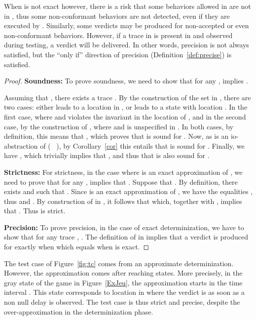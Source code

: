 \documentclass{LMCS}
\theoremstyle{plain}\newtheorem{proposition}[thm]{Proposition}
\begin{document}
When  is not exact however, there is a risk that some
behaviors allowed in  are not in , thus some
non-conformant behaviors are not detected, even if they are executed
by .
Similarly, some  verdicts may be produced for non-accepted 
or even non-conformant behaviors.
However, if a trace in  is present in  and observed during testing, 
a  verdict will be delivered. In other words, precision 
is not  always satisfied, but the ``only if'' direction of 
precision (Definition~\ref{def:precise}) is satisfied.






\begin{proof}

{\bf Soundness:}
To prove soundness, we need to show that for any ,
 implies .

Assuming that , there exists a trace
.  By the
construction of the set  in , there are two cases: either
 leads to a location  in , or
 leads to a state with location .  In the first case,
 where  and  violates the invariant in the location of , and
in the second case, by the construction of ,
 where  and  is unspecified in .  In both cases,
by definition, this means that , which
proves that  is sound for .  Now, as  is an
io-abstraction of  (\ie~ ), by
Corollary~\ref{cor} this entails that  is sound for .
Finally, we have , which trivially implies
that , and thus that  is also sound for .

{\bf Strictness:}
For strictness, in the case where  is an exact approximation of , 
we need to prove that for any ,
 implies that .
Suppose that  . 
By definition, there exists
 and  such that .  
Since  is an exact approximation of , we have 
the equalities , thus  and .  
By construction of  in , it
follows that  which, together with
, implies that .  Thus
 is strict.  

{\bf Precision:}
To prove precision, in the case of exact determinization, 
we have to show that 
for any trace ,
.
The definition of 
  in  
implies that a  verdict is produced for  
exactly when  which equals
   when  is exact.
\end{proof}

\begin{exa}
The test case  of Figure~\ref{fig:tc} comes from an approximate determinization. 
However, the approximation comes after reaching  states.
More precisely, in the gray state of the game in Figure~\ref{ExJeu},
the approximation starts in the time interval .
This state corresponds to location  in 
where the verdict is  as soon as a non null delay is observed.
The test case is thus strict and precise, despite the over-approximation
in the determinization phase.
\end{exa}
\end{document}
